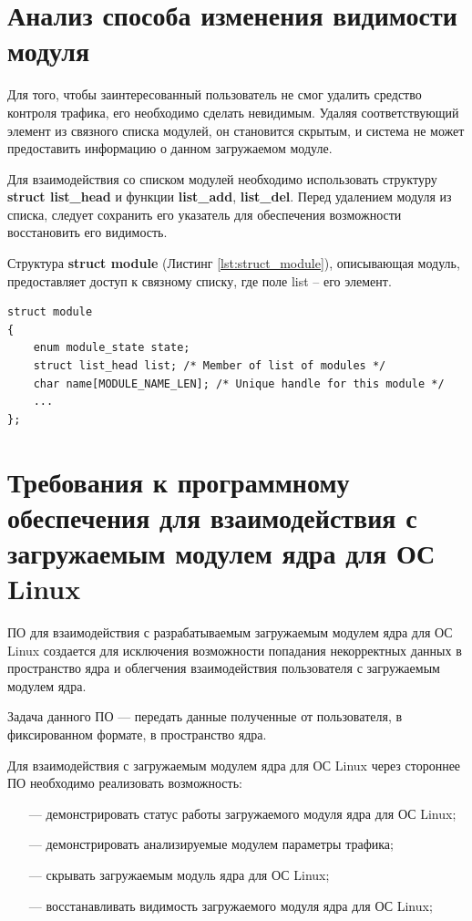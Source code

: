 \documentclass{bmstu}
\begin{document}
\section{Анализ способа изменения видимости модуля}
Для того, чтобы заинтересованный пользователь не смог удалить средство контроля трафика, его необходимо сделать невидимым. Удаляя соответствующий элемент из связного списка модулей, он становится скрытым, и система не может предоставить информацию о данном загружаемом модуле.

Для взаимодействия со списком модулей необходимо использовать структуру \textbf{struct list\_head} и функции \textbf{list\_add}, \textbf{list\_del}. Перед удалением модуля из списка, следует сохранить его указатель для обеспечения возможности восстановить его видимость.

Структура \textbf{struct module} (Листинг \ref{lst:struct_module}), описывающая модуль, предоставляет доступ к связному списку, где поле list -- его элемент.
\begin{lstlisting}[caption = {struct module}, label=lst:struct_module]
struct module
{
	enum module_state state;
	struct list_head list; /* Member of list of modules */
	char name[MODULE_NAME_LEN]; /* Unique handle for this module */
	...
};
\end{lstlisting}



\section{Требования к программному обеспечения для взаимодействия с загружаемым модулем ядра для ОС Linux}

ПО для взаимодействия с разрабатываемым загружаемым модулем ядра для ОС Linux создается для исключения возможности попадания некорректных данных в пространство ядра и облегчения взаимодействия пользователя с загружаемым модулем ядра.

Задача данного ПО --- передать данные полученные от пользователя, в фиксированном формате, в пространство ядра.

Для взаимодействия с загружаемым модулем ядра для ОС Linux через стороннее ПО необходимо реализовать возможность:

\begin{itemize}
    \item[---] демонстрировать статус работы загружаемого модуля ядра для ОС Linux;
    \item[---] демонстрировать анализируемые модулем параметры трафика;
    \item[---] скрывать загружаемым модуль ядра для ОС Linux;
    \item[---] восстанавливать видимость загружаемого модуля ядра для ОС Linux;
\end{itemize}
\end{document}
